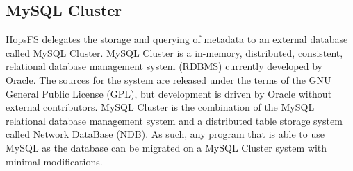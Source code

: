 \subsection{MySQL Cluster}
\label{sec:mysql-cluster}
HopsFS delegates the storage and querying of metadata to an external database called MySQL Cluster.
MySQL Cluster is a in-memory, distributed, consistent, relational database management system (RDBMS) currently developed by Oracle.
The sources for the system are released under the terms of the GNU General Public License (GPL), but development is driven by Oracle without external contributors.
MySQL Cluster is the combination of the MySQL relational database management system and a distributed table storage system called Network DataBase (NDB).
As such, any program that is able to use MySQL as the database can be migrated on a MySQL Cluster system with minimal modifications.

